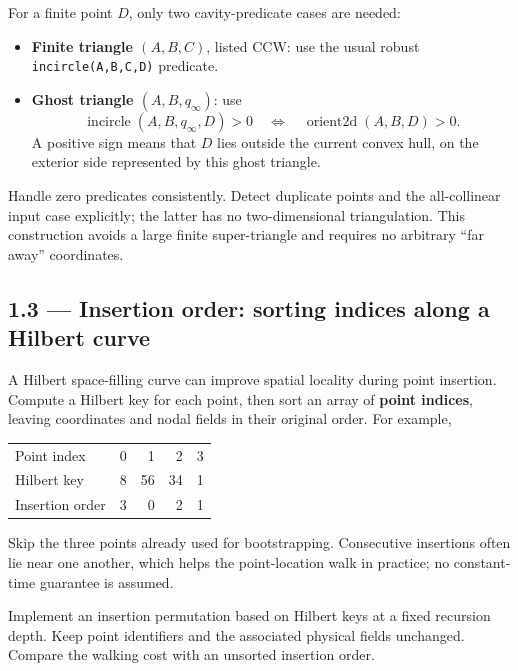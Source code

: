 \documentclass[11pt,a4paper]{article}
\begin{document}
For a finite point $D$, only two cavity-predicate cases are needed:
\begin{itemize}[leftmargin=1.4em]
  \item \textbf{Finite triangle $(A,B,C)$}, listed CCW: use the usual
    robust \lstinline{incircle(A,B,C,D)} predicate.
  \item \textbf{Ghost triangle $(A,B,q_\infty)$}: use
    \[
      \operatorname{incircle}(A,B,q_\infty,D)>0
      \quad\Longleftrightarrow\quad
      \operatorname{orient2d}(A,B,D)>0.
    \]
    A positive sign means that $D$ lies outside the current convex hull,
    on the exterior side represented by this ghost triangle.
\end{itemize}
Handle zero predicates consistently. Detect duplicate points and the
all-collinear input case explicitly; the latter has no two-dimensional
triangulation. This construction avoids a large finite super-triangle and
requires no arbitrary ``far away'' coordinates.

\subsection*{1.3 --- Insertion order: sorting indices along a Hilbert curve}

A Hilbert space-filling curve can improve spatial locality during point
insertion. Compute a Hilbert key for each point, then sort an array of
\textbf{point indices}, leaving coordinates and nodal fields in their
original order. For example,
\begin{center}
\begin{tabular}{lrrrr}
\toprule
Point index & 0 & 1 & 2 & 3 \\
Hilbert key & 8 & 56 & 34 & 1 \\
\midrule
Insertion order & 3 & 0 & 2 & 1 \\
\bottomrule
\end{tabular}
\end{center}
Skip the three points already used for bootstrapping. Consecutive
insertions often lie near one another, which helps the point-location walk
in practice; no constant-time guarantee is assumed.

\begin{task}
Implement an insertion permutation based on Hilbert keys at a fixed
recursion depth. Keep point identifiers and the associated physical fields
unchanged. Compare the walking cost with an unsorted insertion order.
\end{task}
\end{document}
